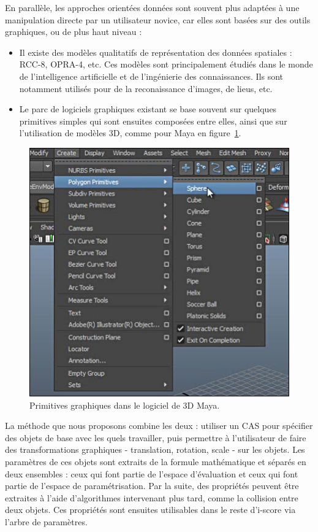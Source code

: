 \documentclass[french,12pt]{article}
\begin{document}
En parallèle, les approches orientées données sont souvent plus adaptées à une manipulation directe par un utilisateur novice, car elles sont basées sur des outils graphiques, ou de plus haut niveau : 
\begin{itemize}
\item Il existe des modèles qualitatifs de représentation des données spatiales : RCC-8, OPRA-4, etc. Ces modèles sont principalement étudiés dans le monde de l'intelligence artificielle et de l'ingénierie des connaissances. Ils sont notamment utilisés pour de la reconaissance d'images, de lieus, etc.
\item Le parc de logiciels graphiques existant se base souvent sur quelques primitives simples qui sont ensuites composées entre elles, ainsi que sur l'utilisation de modèles 3D, comme pour Maya en figure~\ref{fig.maya}.

\end{itemize}

\begin{figure}[h]
\centering
\includegraphics[scale=0.5]{images/maya.jpg}
\caption{Primitives graphiques dans le logiciel de 3D Maya.}
\label{fig.maya}
\end{figure} 

La méthode que nous proposons combine les deux : utiliser un CAS pour spécifier des objets de base avec les quels travailler, puis permettre à l'utilisateur de faire des transformations graphiques - translation, rotation, scale - sur les objets. Les paramètres de ces objets sont extraits de la formule mathématique et séparés en deux ensembles : ceux qui font partie de l'espace d'évaluation et ceux qui font partie de l'espace de paramétrisation. Par la suite, des propriétés peuvent être extraites à l'aide d'algorithmes intervenant plus tard, comme la collision entre deux objets. Ces propriétés sont ensuites utilisables dans le reste d'i-score via l'arbre de paramètres.
\end{document}
